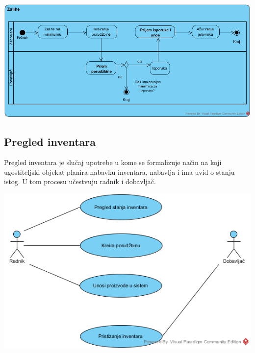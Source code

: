 \documentclass{article}
\begin{document}
\includegraphics[width=\textwidth]{SU_1_zalihe_activity.png}


\subsection{Pregled inventara}
Pregled inventara je slučaj upotrebe u kome se formalizuje način na koji ugostiteljski objekat planira nabavku inventara, nabavlja i ima uvid o stanju istog. U tom procesu učestvuju radnik i dobavljač. 

\includegraphics[width=\textwidth]{SU_2_pregled_inventara.png}
\end{document}
